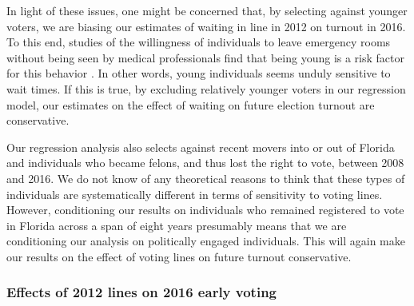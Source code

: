 \documentclass[12pt,titlepage]{article}
\begin{document}
In light of these issues, one might be concerned that, by selecting
against younger voters, we are biasing our estimates of waiting in
line in 2012 on turnout in 2016.  To this end, studies of the
willingness of individuals to leave emergency rooms without being seen
by medical professionals find that being young is a risk factor for
this behavior
\citep{sunetal:lwbs,clareycooke:emergencyroomleave,shaikh:howlongwaiter}.
In other words, young individuals seems unduly sensitive to wait
times.  If this is true, by excluding relatively younger voters in our
regression model, our estimates on the effect of waiting on future
election turnout are conservative.

Our regression analysis also selects against recent movers into or out
of Florida and individuals who became felons, and thus lost the right
to vote, between 2008 and 2016.  We do not know of any theoretical
reasons to think that these types of individuals are systematically
different in terms of sensitivity to voting lines.  However,
conditioning our results on individuals who remained registered to
vote in Florida across a span of eight years presumably means that we
are conditioning our analysis on politically engaged individuals.
This will again make our results on the effect of voting lines on
future turnout conservative.




\subsubsection*{Effects of 2012 lines on 2016 early voting}
\end{document}
